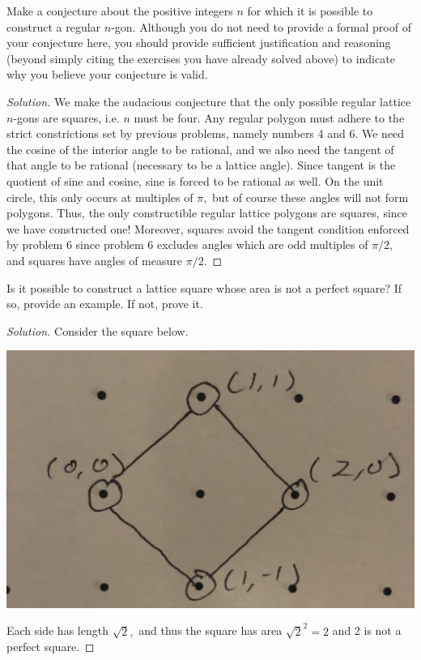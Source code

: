 \documentclass[12pt]{article}
\newenvironment{exercise}[2][Exercise]{\begin{trivlist}
        \item[\hskip \labelsep {\bfseries #1}\hskip \labelsep {\bfseries #2.}]}{\end{trivlist}}
\newenvironment{solution}
        {\begin{proof}[Solution]}
                    {\end{proof}}
\begin{document}
\begin{exercise}{7}
    Make a conjecture about the positive integers \( n \) for which it is possible to construct a regular \( n \)-gon. Although you do not need to provide a formal proof of your conjecture here, you should provide sufficient justification and reasoning (beyond simply citing the exercises you have already solved above) to indicate why you believe your conjecture is valid.
    \begin{solution}
        We make the audacious conjecture that the only possible regular lattice \( n \)-gons are squares, i.e. \( n \) must be four. Any regular polygon must adhere to the strict constrictions set by previous problems, namely numbers 4 and 6. We need the cosine of the interior angle to be rational, and we also need the tangent of that angle to be rational (necessary to be a lattice angle). Since tangent is the quotient of sine and cosine, sine is forced to be rational as well. On the unit circle, this only occurs at multiples of \( \pi, \) but of course these angles will not form polygons. Thus, the only constructible regular lattice polygons are squares, since we have constructed one! Moreover, squares avoid the tangent condition enforced by problem 6 since problem 6 excludes angles which are odd multiples of \( \pi/2 \), and squares have angles of measure \( \pi/2. \)
    \end{solution}
\end{exercise}

\begin{exercise}{8}
    Is it possible to construct a lattice square whose area is not a perfect square? If so, provide an example. If not, prove it.
    \begin{solution}
        Consider the square below.
        \begin{center}
        \includegraphics[width=.4\linewidth]{8}
        \end{center}
        Each side has length \( \sqrt{2} , \) and thus the square has area \( \sqrt{2}^{2} = 2 \) and 2 is not a perfect square.
    \end{solution}
\end{exercise}
\end{document}

